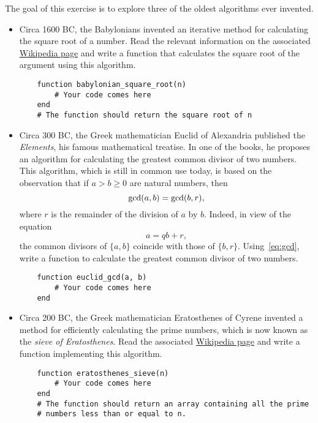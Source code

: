 \begin{task}
    The goal of this exercise is to explore three of the oldest algorithms ever invented.
    \begin{itemize}
        \item
            Circa 1600 BC, the Babylonians invented an iterative method for calculating the square root of a number.
            Read the relevant information on the associated \href{https://en.wikipedia.org/wiki/Methods_of_computing_square_roots#Babylonian_method}{Wikipedia page} and write a function that
            calculates the square root of the argument using this algorithm.
    \begin{verbatim}
    function babylonian_square_root(n)
        # Your code comes here
    end
    # The function should return the square root of n
    \end{verbatim}

        \item
            Circa 300 BC,
            the Greek mathematician Euclid of Alexandria published the \emph{Elements},
            his famous mathematical treatise.
            In one of the books,
            he proposes an algorithm for calculating the greatest common divisor of two numbers.
            This algorithm,
            which is still in common use today,
            is based on the observation that if $a > b \geq 0$ are natural numbers,
            then
            \begin{equation}
                \label{eq:gcd}
                {\rm gcd} (a, b) = {\rm gcd}(b, r),
            \end{equation}
            where $r$ is the remainder of the division of $a$ by $b$.
            Indeed, in view of the equation
            \[
                a = q b + r,
            \]
            the common divisors of $\{a,b\}$ coincide with those of $\{b, r\}$.
            Using~\eqref{eq:gcd},
            write a function to calculate the greatest common divisor of two numbers.
    \begin{verbatim}
    function euclid_gcd(a, b)
        # Your code comes here
    end
    \end{verbatim}

        \item Circa 200 BC,
            the Greek mathematician Eratosthenes of Cyrene invented a method for efficiently calculating the prime numbers,
            which is now known as the \emph{sieve of Eratosthenes}.
            Read the associated \href{https://en.wikipedia.org/wiki/Sieve_of_Eratosthenes}{Wikipedia page}
            and write a function implementing this algorithm.
    \begin{verbatim}
    function eratosthenes_sieve(n)
        # Your code comes here
    end
    # The function should return an array containing all the prime
    # numbers less than or equal to n.
    \end{verbatim}
    \end{itemize}
\end{task}

